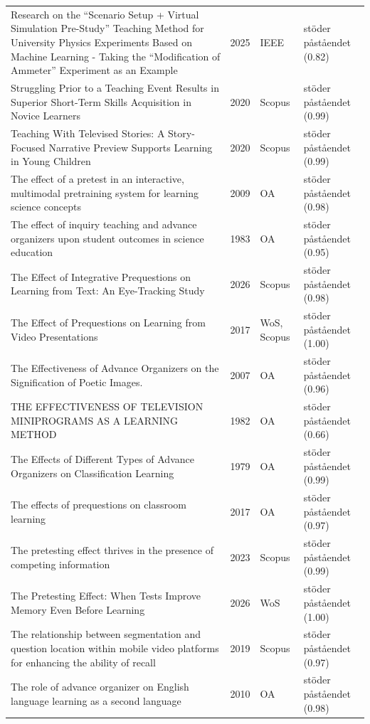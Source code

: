 \begin{longtable}{@{}%
  >{\raggedright\arraybackslash}p{}c%
  >{\raggedright\arraybackslash}p{}%
  >{\raggedright\arraybackslash}p{}@{}}
Research on the ``Scenario Setup + Virtual Simulation Pre-Study'' Teaching Method for University Physics Experiments Based on Machine Learning - Taking the ``Modification of Ammeter'' Experiment as an Example & 2025 & IEEE & stöder påståendet (0.82) \\
Struggling Prior to a Teaching Event Results in Superior Short-Term Skills Acquisition in Novice Learners & 2020 & Scopus & stöder påståendet (0.99) \\
Teaching With Televised Stories: A Story-Focused Narrative Preview Supports Learning in Young Children & 2020 & Scopus & stöder påståendet (0.99) \\
The effect of a pretest in an interactive, multimodal pretraining system for learning science concepts & 2009 & OA & stöder påståendet (0.98) \\
The effect of inquiry teaching and advance organizers upon student outcomes in science education & 1983 & OA & stöder påståendet (0.95) \\
The Effect of Integrative Prequestions on Learning from Text: An Eye-Tracking Study & 2026 & Scopus & stöder påståendet (0.98) \\
The Effect of Prequestions on Learning from Video Presentations & 2017 & WoS, Scopus & stöder påståendet (1.00) \\
The Effectiveness of Advance Organizers on the Signification of Poetic Images. & 2007 & OA & stöder påståendet (0.96) \\
THE EFFECTIVENESS OF TELEVISION MINIPROGRAMS AS A LEARNING METHOD & 1982 & OA & stöder påståendet (0.66) \\
The Effects of Different Types of Advance Organizers on Classification Learning & 1979 & OA & stöder påståendet (0.99) \\
The effects of prequestions on classroom learning & 2017 & OA & stöder påståendet (0.97) \\
The pretesting effect thrives in the presence of competing information & 2023 & Scopus & stöder påståendet (0.99) \\
The Pretesting Effect: When Tests Improve Memory Even Before Learning & 2026 & WoS & stöder påståendet (1.00) \\
The relationship between segmentation and question location within mobile video platforms for enhancing the ability of recall & 2019 & Scopus & stöder påståendet (0.97) \\
The role of advance organizer on English language learning as a second language & 2010 & OA & stöder påståendet (0.98) \\

\end{longtable}
